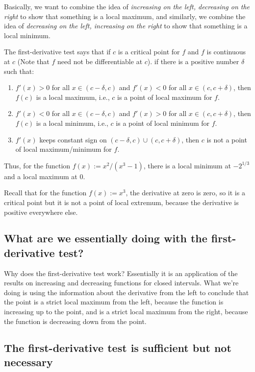 \documentclass{amsart}
\begin{document}
Basically, we want to combine the idea of {\em increasing on the left,
  decreasing on the right} to show that something is a local maximum,
  and similarly, we combine the idea of {\em decreasing on the left,
  increasing on the right} to show that something is a local minimum.

The first-derivative test says that if $c$ is a critical point for $f$
and $f$ is continuous at $c$ (Note that $f$ need not be differentiable
at $c$). if there is a positive number $\delta$ such that:

\begin{enumerate}
\item $f'(x) > 0$ for all $x \in (c -\delta, c)$ and $f'(x) < 0$ for
  all $x \in (c,c+\delta)$, then $f(c)$ is a local maximum, i.e., $c$
  is a point of local maximum for $f$.
\item $f'(x) < 0$ for all $x \in (c - \delta,c)$ and $f'(x) > 0$ for
  all $x \in (c,c+\delta)$, then $f(c)$ is a local minimum, i.e., $c$
  is a point of local minimum for $f$.
\item $f'(x)$ keeps constant sign on $(c - \delta,c) \cup
  (c,c+\delta)$, then $c$ is not a point of local maximum/minimum for
  $f$.
\end{enumerate}

Thus, for the function $f(x) := x^2/(x^3 - 1)$, there is a local
minimum at $-2^{1/3}$ and a local maximum at $0$.

Recall that for the function $f(x) := x^3$, the derivative at zero is
zero, so it is a critical point but it is not a point of local
extremum, because the derivative is positive everywhere else.

\subsection{What are we essentially doing with the first-derivative test?}

Why does the first-derivative test work? Essentially it is an
application of the results on increasing and decreasing functions for
closed intervals. What we're doing is using the information about the
derivative from the left to conclude that the point is a strict local
maximum from the left, because the function is increasing up to the
point, and is a strict local maximum from the right, because the
function is decreasing down from the point.

\subsection{The first-derivative test is sufficient but not necessary}
\end{document}

